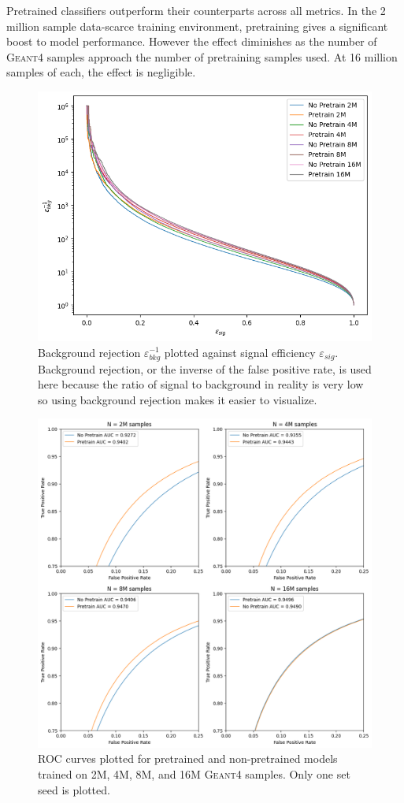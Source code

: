 Pretrained classifiers outperform their counterparts across all metrics. In the 2 million sample data-scarce training environment, pretraining gives a significant boost to model performance. However the effect diminishes as the number of \textsc{Geant4} samples approach the number of pretraining samples used. At 16 million samples of each, the effect is negligible.

\begin{figure}
    \centering
    \includegraphics[width=0.75\linewidth]{figures/performance_curves.png}
    \caption{Background rejection $\varepsilon_{bkg}^{-1}$ plotted against signal efficiency $\varepsilon_{sig}$. Background rejection, or the inverse of the false positive rate, is used here because the ratio of signal to background in reality is very low so using background rejection makes it easier to visualize.}
    \label{fig:performance_curves}
\end{figure}

\begin{figure}
    \centering
    \includegraphics[width=1\linewidth]{figures/four_roc_curves.png}
    \caption{ROC curves plotted for pretrained and non-pretrained models trained on 2M, 4M, 8M, and 16M \textsc{Geant4} samples. Only one set seed is plotted.}
    \label{fig:four_roc_curves}
\end{figure}

